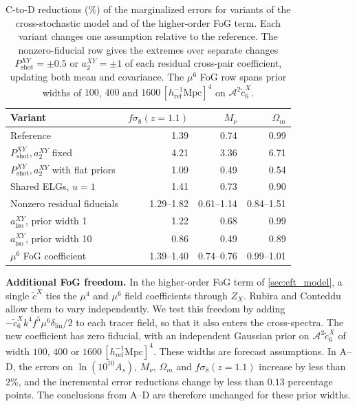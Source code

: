 \documentclass[a4paper,11pt]{article}
\newcommand{\revchange}[1]{{\color{RevisionColor}#1}}
\newcommand{\Om}{\Omega_m}
\newcommand{\se}{\ensuremath{\sigma_{8}}\xspace}
\newcommand{\Mnu}{M_\nu}
\newcommand{\ctilde}{\tilde{c}}
\newcommand{\Pshot}{P_{\mathrm{shot}}}
\begin{document}
\begin{table}[t]
\centering\color{RevisionColor}
\small
\begin{tabular}{lrrr}
\hline
Variant & $f\se(z=1.1)$ & $\Mnu$ & $\Om$ \\
\hline
Reference & 1.39 & 0.74 & 0.99 \\
$\Pshot^{XY},a_2^{XY}$ fixed & 4.21 & 3.36 & 6.71 \\
$\Pshot^{XY},a_2^{XY}$ with flat priors & 1.09 & 0.49 & 0.54 \\
Shared ELGs, $u=1$ & 1.41 & 0.73 & 0.90 \\
Nonzero residual fiducials & 1.29--1.82 & 0.61--1.14 & 0.84--1.51 \\
$a_{\mathrm{iso}}^{XY}$, prior width 1 & 1.22 & 0.68 & 0.99 \\
$a_{\mathrm{iso}}^{XY}$, prior width 10 & 0.86 & 0.49 & 0.89 \\
$\mu^6$ FoG coefficient & 1.39--1.40 & 0.74--0.76 & 0.99--1.01 \\
\hline
\end{tabular}
\caption{\color{RevisionColor}C-to-D reductions (\%) of the marginalized errors for variants of the
cross-stochastic model and of the higher-order FoG term. Each variant changes
one assumption relative to the reference. The nonzero-fiducial row gives the
extremes over separate changes $\Pshot^{XY}=\pm0.5$ or $a_2^{XY}=\pm1$ of each
residual cross-pair coefficient, updating both mean and covariance. The $\mu^6$
FoG row spans prior widths of $100$, $400$ and
$1600\,[h_{\mathrm{ref}}^{-1}\mathrm{Mpc}]^4$ on $\mathcal A^2\ctilde_6^X$.}
\label{tab:crossmodel}
\end{table}

\revchange{\textbf{Additional FoG freedom.} In the higher-order FoG term of
\cref{sec:eft_model}, a single
$\ctilde^X$ ties the $\mu^4$ and $\mu^6$ field coefficients through $Z_X$.
Rubira and Conteddu~\cite{Rubira:2025scu} allow them to vary independently.
We test this freedom by adding
$-\ctilde_6^X k^4f^5\mu^6\delta_{\mathrm{lin}}/2$ to each tracer field,
so that it also enters the cross-spectra. The new coefficient has zero
fiducial, with an independent Gaussian prior on $\mathcal A^2\ctilde_6^X$ of width $100$,
$400$ or $1600\,[h_{\mathrm{ref}}^{-1}\mathrm{Mpc}]^4$. These widths are forecast assumptions. In A--D, the errors on $\ln(10^{10}A_s)$, $\Mnu$,
$\Om$ and $f\se(z=1.1)$ increase by less than $2\%$, and the incremental
error reductions change by less than $0.13$ percentage points.
The conclusions from A--D are therefore unchanged for these prior widths.}
\end{document}
